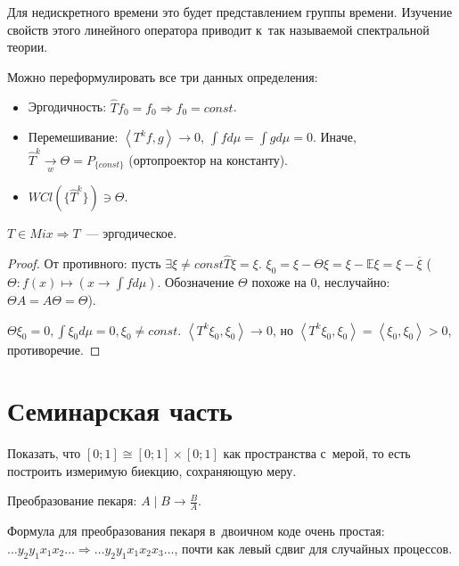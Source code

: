 \documentclass{article}
\begin{document}
Для недискретного времени это будет представлением группы времени. Изучение
свойств этого линейного оператора приводит к~так называемой спектральной теории.

\begin{remark}
	Можно переформулировать все три данных определения:
	\begin{itemize}
		\item Эргодичность: $\hat T f_0 = f_0 \Rightarrow f_0 = const$.
		\item Перемешивание: $\left<T^k f, g\right> \rightarrow 0$, $\int f d\mu =
			\int g d\mu = 0$. Иначе, $\hat T^k \underset{w}{\rightarrow} \Theta =
			P_{\{const\}}$ (ортопроектор на константу).
		\item $WCl(\{\hat T^k\}) \ni \Theta$.
	\end{itemize}
\end{remark}

\begin{theorem}
	$T \in Mix \Rightarrow T$~--- эргодическое.
\end{theorem}
\begin{proof}
	От противного: пусть $\exists \xi \ne const \hat T \xi = \xi$.
	$\xi_0 = \xi - \Theta \xi = \xi - \mathbb{E}\xi = \xi - \overline{\xi}$
	($\Theta: f(x) \mapsto (x \rightarrow \int f d\mu)$. Обозначение $\Theta$
	похоже на 0, неслучайно: $\Theta A = A \Theta = \Theta$).

	$\Theta \xi_0 = 0, \int \xi_0 d\mu = 0, \xi_0 \ne const$.
	$\left< T^k \xi_0, \xi_0 \right> \rightarrow 0$, но $\left< T^k \xi_0, \xi_0
	\right> = \left< \xi_0, \xi_0 \right> > 0$, противоречие.
\end{proof}

\section{Семинарская часть}

\begin{exercise}
	Показать, что $[0; 1] \cong [0; 1] \times [0; 1]$ как пространства с~мерой, то
	есть построить измеримую биекцию, сохраняющую меру.
\end{exercise}
\begin{definition}
	Преобразование пекаря: $A\mid B \rightarrow \frac{B}{A}$.
\end{definition}

Формула для преобразования пекаря в~двоичном коде очень простая: $\ldots y_2
y_1 x_1 x_2 \ldots \Rightarrow \ldots y_2 y_1 x_1 x_2 x_3 \ldots$, почти как
левый сдвиг для случайных процессов.
\end{document}
